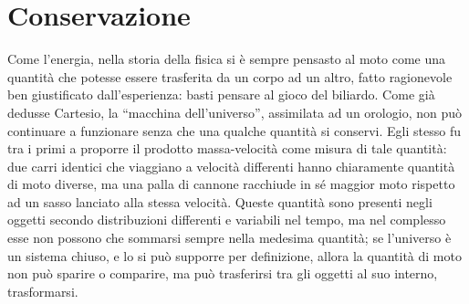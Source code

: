 \section{Conservazione}
Come l'energia, nella storia della fisica si è sempre pensasto al moto
come una quantità che potesse essere trasferita da un corpo ad un altro,
fatto ragionevole ben giustificato dall'esperienza: basti pensare al
gioco del biliardo.
Come già dedusse Cartesio, la ``macchina dell'universo'', assimilata ad
un orologio, non può continuare a funzionare senza che una qualche quantità
si conservi. Egli stesso fu tra i primi a proporre il prodotto massa-velocità
come misura di tale quantità: due carri identici che viaggiano a velocità differenti
hanno chiaramente quantità di moto diverse, ma una palla di cannone
racchiude in sé maggior moto rispetto ad un sasso lanciato alla stessa
velocità. Queste quantità sono presenti negli oggetti secondo distribuzioni
differenti e variabili nel tempo, ma nel complesso esse non possono che
sommarsi sempre nella medesima quantità; se l'universo è un sistema chiuso,
e lo si può supporre per definizione, allora la quantità di moto non può
sparire o comparire, ma può trasferirsi tra gli oggetti al suo
interno, trasformarsi.

